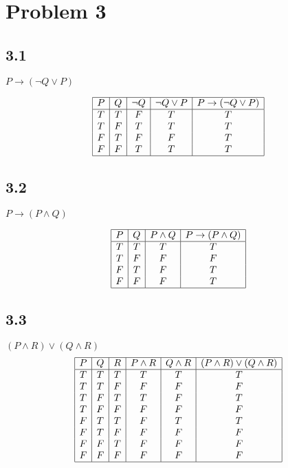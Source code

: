\documentclass{article}
\begin{document}
\section*{Problem 3}
\begin{multicols}{2}
\subsection*{3.1}
$P\rightarrow ( \neg Q \vee P)$

\begin{displaymath}
\begin{array}{|c|c|c|c|c|}
\hline 
P & Q & \neg Q & \neg Q \vee P & P \rightarrow ( \neg Q \vee P)\\   %
\hline 
T & T & F & T & T \\
T & F & T & T & T \\
F & T & F & F & T \\
F & F & T & T & T \\
\hline 
\end{array}
\end{displaymath}

\subsection*{3.2}
$P\rightarrow ( P \land Q)$

\begin{displaymath}
\begin{array}{|c|c|c|c|}
\hline 
P & Q &  P \land Q & P \rightarrow  (P \land Q) \\   %
\hline 
T & T & T & T \\
T & F & F & F \\
F & T & F & T \\
F & F & F & T \\
\hline 
\end{array}
\end{displaymath}
\end{multicols}

\subsection*{3.3}
$(P \land R) \vee (Q \land R)$
\begin{displaymath}
\begin{array}{|c|c|c|c|c|c|}
\hline 
P & Q & R & P \land R & Q \land R & (P \land R) \vee (Q \land R)  \\   %
\hline 
T & T & T & T & T & T \\
T & T & F & F & F & F \\
T & F & T & T & F & T \\
T & F & F & F & F & F \\
F & T & T & F & T & T \\
F & T & F & F & F & F \\
F & F & T & F & F & F \\
F & F & F & F & F & F \\
\hline 
\end{array}
\end{displaymath}
\\\\
\end{document}

